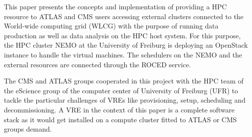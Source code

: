 This paper presents the concepts and implementation of providing a HPC resource
to ATLAS and CMS users accessing external clusters connected to the World-wide
computing grid (WLCG) with the purpose of running data production as well as
data analysis on the HPC host system.  For this purpose, the HPC cluster NEMO at
the University of Freiburg is deploying an OpenStack instance to handle the
virtual machines.  The schedulers on the NEMO and the external resources are
connected through the ROCED service\cite{ROCED}.

The CMS and ATLAS groups cooperated in this project with the HPC team of the
eScience group of the computer center of University of Freiburg (UFR) to tackle
the particular challenges of VREs like provisioning, setup, scheduling and
decommissioning. A VRE in the context of this paper is a complete software stack
as it would get installed on a compute cluster fitted to ATLAS or CMS groups
demand.

